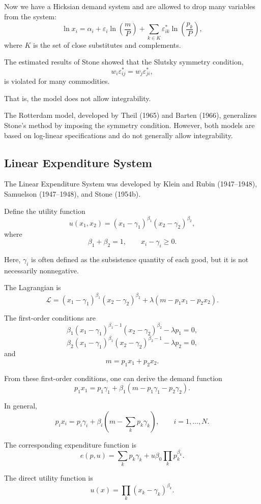 Now we have a Hicksian demand system and are allowed to drop many variables from the system:
\[
\ln x_i
=
\alpha_i
+
\varepsilon_i\ln\left(\frac{m}{P}\right)
+
\sum_{k\in K}
\varepsilon_{ik}^*
\ln\left(\frac{p_k}{P}\right),
\]
where \(K\) is the set of close substitutes and complements.

The estimated results of Stone showed that the Slutsky symmetry condition,
\[
w_i\varepsilon_{ij}^*
=
w_j\varepsilon_{ji}^*,
\]
is violated for many commodities.

That is, the model does not allow integrability.

The Rotterdam model, developed by Theil (1965) and Barten (1966), generalizes Stone's method by imposing the symmetry condition. However, both models are based on log-linear specifications and do not generally allow integrability.

\subsection{Linear Expenditure System}

The Linear Expenditure System was developed by Klein and Rubin (1947--1948), Samuelson (1947--1948), and Stone (1954b).

Define the utility function
\[
u(x_1,x_2)
=
(x_1-\gamma_1)^{\beta_1}
(x_2-\gamma_2)^{\beta_2},
\]
where
\[
\beta_1+\beta_2=1,
\qquad
x_i-\gamma_i\ge 0.
\]

Here, \(\gamma_i\) is often defined as the subsistence quantity of each good, but it is not necessarily nonnegative.

The Lagrangian is
\[
\mathcal{L}
=
(x_1-\gamma_1)^{\beta_1}
(x_2-\gamma_2)^{\beta_2}
+
\lambda(m-p_1x_1-p_2x_2).
\]

The first-order conditions are
\[
\beta_1
(x_1-\gamma_1)^{\beta_1-1}
(x_2-\gamma_2)^{\beta_2}
-
\lambda p_1
=
0,
\]
\[
\beta_2
(x_1-\gamma_1)^{\beta_1}
(x_2-\gamma_2)^{\beta_2-1}
-
\lambda p_2
=
0,
\]
and
\[
m=p_1x_1+p_2x_2.
\]

From these first-order conditions, one can derive the demand function
\[
p_1x_1
=
p_1\gamma_1
+
\beta_1
\left(
m-p_1\gamma_1-p_2\gamma_2
\right).
\]

In general,
\[
p_ix_i
=
p_i\gamma_i
+
\beta_i
\left(
m-\sum_k p_k\gamma_k
\right),
\qquad
i=1,\dots,N.
\]

The corresponding expenditure function is
\[
e(p,u)
=
\sum_k p_k\gamma_k
+
u\beta_0
\prod_k p_k^{\beta_k}.
\]

The direct utility function is
\[
u(x)
=
\prod_k (x_k-\gamma_k)^{\beta_k}.
\]

